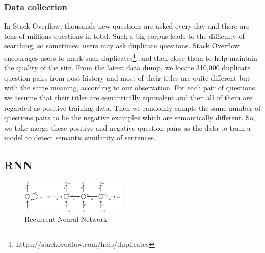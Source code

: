 	\subsubsection{Data collection}
	In Stack Overflow, thousands new questions are asked every day and there are tens of millions questions in total.
	Such a big corpus leads to the difficulty of searching, so sometimes, users may ask duplicate questions.
	Stack Overflow encourages users to mark such duplicates\footnote{https://stackoverflow.com/help/duplicates}, and then close them to help maintain the quality of the site.
	From the latest data dump, we locate 310,000 duplicate question pairs from post history and most of their titles are quite different but with the same meaning, according to our observation.
	For each pair of questions, we assume that their titles are semantically equivalent and then all of them are regarded as positive training data.
	Then we randomly sample the same-number of questions pairs to be the negative examples which are semantically different.
	So, we take merge these positive and negative question pairs as the data to train a model to detect semantic similarity of sentences. 
	 	

	
	\subsection{RNN}
	
	\begin{figure}[!t]
		\centering
		\includegraphics[width=0.45\textwidth]{figures/rnn.pdf}
		\caption{Recurrent Neural Network}
		\label{fig:rnn}
	\end{figure}
	
